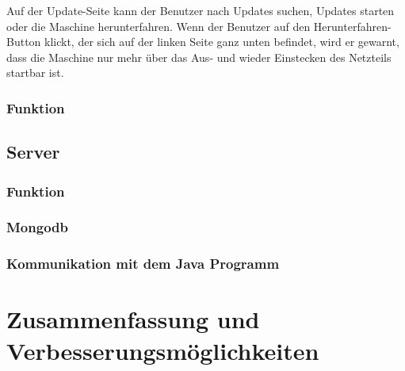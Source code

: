Auf der Update-Seite kann der Benutzer nach Updates suchen, Updates starten oder die Maschine herunterfahren. Wenn der Benutzer auf den Herunterfahren-Button klickt, der sich auf der linken Seite ganz unten befindet, wird er gewarnt, dass die Maschine nur mehr über das Aus- und wieder Einstecken des Netzteils startbar ist.\\

\subsubsection{Funktion}
\label{sec:ums-client-funktion}


\subsection{Server}
\label{sec:ums-server}

\subsubsection{Funktion}
\label{sec:ums-server-funktion}

\subsubsection{Mongodb}
\label{sec:ums-server-mongo}

\subsubsection{Kommunikation mit dem Java Programm}
\label{sec:ums-server-java}

\section{Zusammenfassung und Verbesserungsmöglichkeiten}
\label{sec:zusammenfassung}